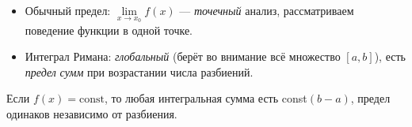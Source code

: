 \medskip


\begin{itemize}
  \item Обычный предел: $\lim\limits_{x\to x_0} f(x)$ — \emph{точечный} анализ, рассматриваем поведение функции в одной точке.
  \item Интеграл Римана: \emph{глобальный} (берёт во внимание всё множество $[a,b]$), есть \textit{предел} \emph{сумм} при возрастании числа разбиений.
\end{itemize}

\medskip


Если $f(x)=\text{const}$, то любая интегральная сумма есть const\((b-a)\), предел одинаков независимо от разбиения.
